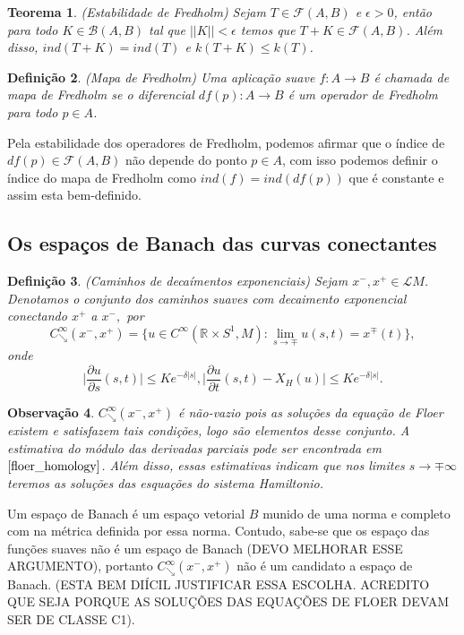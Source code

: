 \documentclass[12pt]{book}
\newtheorem{teorema}{Teorema}[section]
\newtheorem{definicao}[teorema]{Definição}
\newtheorem{observacao}[teorema]{Observação}
\newcommand{\aplicaoessuavesreatacirculo}{C^{\infty}(\retacartesianocirculo, M)}
\newcommand{\caminhosdecaimentoexponencial}[2]{C^{\infty}_{\searrow}(#1, #2)}
\newcommand{\caminhosdecaimentoexponencialpadrao}{\caminhosdecaimentoexponencial{x^{-}}{x^{+}}}
\newcommand{\circulo}{S^{1}}
\newcommand{\derivadaparcial}[2]{\frac{\partial #1}{\partial #2}}
\newcommand{\operadoresfredholm}[2]{\mathcal{F}(#1, #2)}
\newcommand{\operadoreslimitados}[2]{\mathcal{B}(#1, #2)}
\newcommand{\retacartesianocirculo}{\real{} \times \circulo}
\newcommand{\real}[1]{\mathbb{R}^{#1}}
\newcommand{\solucoesperiodicascontrateis}{\mathcal{L}M}
\newcommand{\vermelho}[1]{{\color{red}#1}}
\begin{document}
	\begin{teorema}\label{teorema_estabilidade_fredholm}
		(Estabilidade de Fredholm) Sejam  $T \in \operadoresfredholm{A}{B}$ e $\epsilon>0$, então para todo $K \in \operadoreslimitados{A}{B}$ tal que $||K|| < \epsilon$ temos que $T+K \in \operadoresfredholm{A}{B}$. Além disso, $ind(T+K)=ind(T)$ e $k(T+K) \leq k(T)$.
	\end{teorema}
	
	\begin{definicao}
		(Mapa de Fredholm) Uma aplicação suave $f: A \to B$ é chamada de mapa de Fredholm se o diferencial $df(p): A \to B$ é um operador de Fredholm para todo $p \in A$.
	\end{definicao}
	
	
	Pela estabilidade dos operadores de Fredholm, podemos afirmar que o índice de $df(p) \in \operadoresfredholm{A}{B}$ não depende do ponto $p \in A$, com isso podemos definir o índice do mapa de Fredholm como $ind(f)=ind(df(p))$ que é constante e assim esta bem-definido.
	
	\subsection{Os espaços de Banach das curvas conectantes}
	
	\begin{definicao}\label{definimos_caminhos_decaimentos_exponenciais}
		(Caminhos de decaímentos exponenciais) Sejam $x^{-}, x^{+} \in \solucoesperiodicascontrateis$. Denotamos o conjunto dos caminhos suaves com decaimento exponencial conectando $x^{+}$ a $x^{-}, $ por
		$$
		\caminhosdecaimentoexponencialpadrao = \{u \in \aplicaoessuavesreatacirculo: \lim_{s \to \mp} u(s,t) = x^{\mp}(t) \},
		$$
		onde 
		$$
		\Big|\derivadaparcial{u}{s}(s,t)\Big| \leq Ke^{-\delta|s|},  \Big|\derivadaparcial{u}{t}(s,t) -X_{H}(u) \Big| \leq Ke^{-\delta|s|}.
		$$
	\end{definicao}
	
	\begin{observacao}
		$\caminhosdecaimentoexponencialpadrao$ é não-vazio pois as soluções da equação de Floer existem e satisfazem tais condições, logo são elementos desse conjunto. A estimativa do módulo das derivadas parciais pode ser encontrada em $\cite{floer_homology}$. Além disso, essas estimativas indicam que nos limites $s\to \mp \infty$ teremos as soluções das esquações do sistema Hamiltonio.
	\end{observacao}
	
	Um espaço de Banach é um espaço vetorial $B$ munido de uma norma e completo com na métrica definida por essa norma. Contudo, sabe-se que os espaço das funções suaves não é um espaço de Banach \vermelho{(DEVO MELHORAR ESSE ARGUMENTO)}, portanto $\caminhosdecaimentoexponencialpadrao$ não é um candidato a espaço de Banach. \vermelho{(ESTA BEM DIÍCIL JUSTIFICAR ESSA ESCOLHA. ACREDITO QUE SEJA PORQUE AS SOLUÇÕES DAS EQUAÇÕES DE FLOER DEVAM SER DE CLASSE C1).}
	
\end{document}
